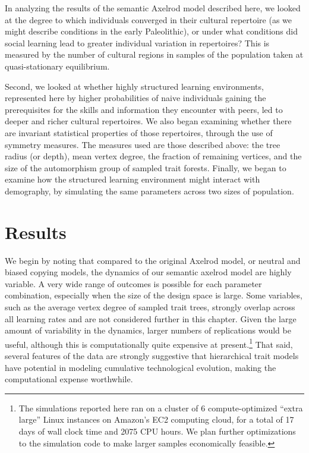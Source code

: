 \documentclass[referee,graybox,natbib]{svmult}
\begin{document}
In analyzing the results of the semantic Axelrod model described here,
we looked at the degree to which individuals converged in their cultural
repertoire (as we might describe conditions in the early Paleolithic),
or under what conditions did social learning lead to greater individual
variation in repertoires? This is measured by the number of cultural
regions in samples of the population taken at quasi-stationary
equilibrium.

Second, we looked at whether highly structured learning environments,
represented here by higher probabilities of naive individuals gaining
the prerequisites for the skills and information they encounter with
peers, led to deeper and richer cultural repertoires. We also began
examining whether there are invariant statistical properties of those
repertoires, through the use of symmetry measures. The measures used are
those described above: the tree radius (or depth), mean vertex degree,
the fraction of remaining vertices, and the size of the automorphism
group of sampled trait forests. Finally, we began to examine how the
structured learning environment might interact with demography, by
simulating the same parameters across two sizes of population.

\section{Results}\label{results}

We begin by noting that compared to the original Axelrod model, or
neutral and biased copying models, the dynamics of our semantic axelrod
model are highly variable. A very wide range of outcomes is possible for
each parameter combination, especially when the size of the design space
is large. Some variables, such as the average vertex degree of sampled
trait trees, strongly overlap across all learning rates and are not
considered further in this chapter. Given the large amount of
variability in the dynamics, larger numbers of replications would be
useful, although this is computationally quite expensive at
present.\footnote{The simulations reported here ran on a cluster of 6
  compute-optimized ``extra large'' Linux instances on Amazon's EC2
  computing cloud, for a total of 17 days of wall clock time and 2075
  CPU hours. We plan further optimizations to the simulation code to
  make larger samples economically feasible.} That said, several
features of the data are strongly suggestive that hierarchical trait
models have potential in modeling cumulative technological evolution,
making the computational expense worthwhile.
\end{document}
